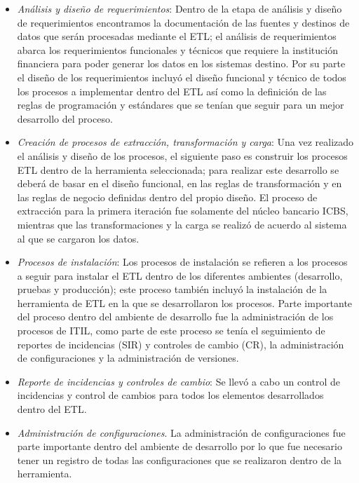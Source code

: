 \begin{itemize}

\item \textit{Análisis y diseño de requerimientos}: Dentro de la etapa de
  análisis y diseño de requerimientos encontramos la documentación de las
  fuentes y destinos de datos que serán procesadas mediante el ETL; el análisis
  de requerimientos abarca los requerimientos funcionales y técnicos que
  requiere la institución financiera para poder generar los datos en los
  sistemas destino.  Por su parte el diseño de los requerimientos incluyó el
  diseño funcional y técnico de todos los procesos a implementar dentro del ETL
  así como la definición de las reglas de programación y estándares que se
  tenían que seguir para un mejor desarrollo del proceso.

\item \textit{Creación de procesos de extracción, transformación y carga}: Una
  vez realizado el análisis y diseño de los procesos, el siguiente paso es
  construir los procesos ETL dentro de la herramienta seleccionada; para
  realizar este desarrollo se deberá de basar en el diseño funcional, en las
  reglas de transformación y en las reglas de negocio definidas dentro del
  propio diseño. El proceso de extracción para la primera iteración fue
  solamente del núcleo bancario ICBS, mientras que las transformaciones y la
  carga se realizó de acuerdo al sistema al que se cargaron los datos.

\item \textit{Procesos de instalación}: Los procesos de instalación se refieren
  a los procesos a seguir para instalar el ETL dentro de los diferentes
  ambientes (desarrollo, pruebas y producción); este proceso también incluyó la
  instalación de la herramienta de ETL en la que se desarrollaron los procesos.
  Parte importante del proceso dentro del ambiente de desarrollo fue la
  administración de los procesos de ITIL, como parte de este proceso se tenía el
  seguimiento de reportes de incidencias (SIR) y controles de cambio (CR), la
  administración de configuraciones y la administración de versiones.

\item \textit{Reporte de incidencias y controles de cambio}: Se llevó a cabo un
  control de incidencias y control de cambios para todos los elementos
  desarrollados dentro del ETL.

\item \textit{Administración de configuraciones}. La administración de
  configuraciones fue parte importante dentro del ambiente de desarrollo por lo
  que fue necesario tener un registro de todas las configuraciones que se
  realizaron dentro de la herramienta.


\end{itemize}
